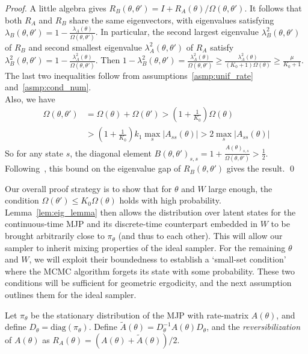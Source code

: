 \begin{proof}
A little algebra gives $R_B(\theta,\theta') = I + R_A(\theta)/\Omega(\theta,\theta')$. It 
follows that both $R_A$ and $R_B$ share the same eigenvectors, with 
eigenvalues satisfying 
$\lambda_B(\theta, \theta') = 1 - \frac{\lambda_A(\theta)}{\Omega(\theta,
\theta')}$. In particular, the second largest eigenvalue 
$\lambda^2_B(\theta,\theta')$ of $R_B$ and  
second smallest eigenvalue $\lambda^2_A(\theta,\theta')$ of $R_A$ satisfy  
$\lambda^2_B(\theta,\theta') = 1 - \frac{\lambda^2_A(\theta)}{\Omega(\theta, \theta')}$.
Then $1 - \lambda^2_B(\theta,\theta') = \frac{\lambda^2_A(\theta)}{\Omega(\theta, \theta')} 
\ge \frac{\lambda^2_A(\theta)}{(K_0+1)\Omega(\theta)} 
\ge \frac{\mu}{K_0+1} $. The last two inequalities follow from 
assumptions~\ref{asmp:unif_rate} and~\ref{asmp:cond_num}. \\
Also, we have
\begin{align*}
\Omega(\theta, \theta') &= \Omega(\theta) + \Omega(\theta') > (1 + \frac{1}{K_0})\Omega(\theta)\\
& > (1 + \frac{1}{K_0})k_1\max_s |A_{ss}(\theta)| > 2\max_s |A_{ss}(\theta)| %
\end{align*}
So for any state $s$, the diagonal element $B(\theta, \theta')_{s,s} = 1 + \frac{A(\theta)_{s,s}}{\Omega(\theta, \theta')}> \frac{1}{2}$.
Following~\cite{fill1991}, this bound on the eigenvalue gap of $R_B(\theta,\theta')$ gives the result.
\qed
\end{proof}

Our overall proof strategy is to show that for $\theta$ and $W$ large enough, 
the condition $\Omega(\theta') \le K_0 \Omega(\theta)$ holds with 
high probability. Lemma~\ref{lem:eig_lemma} then allows the distribution 
over latent states for the continuous-time MJP and its discrete-time 
counterpart embedded in $W$ to be brought arbitrarily close to $\pi_\theta$ 
(and thus to each other).
This will allow our sampler 
to inherit mixing properties of the ideal sampler. For the remaining 
$\theta$ and $W$, we will exploit their boundedness to establish a 
`small-set condition' where the MCMC algorithm forgets its state with 
some probability. These two conditions will be sufficient for 
geometric ergodicity, and the next assumption outlines them for the ideal 
sampler.
\begin{definition}
Let $\pi_\theta$ be the stationary distribution of the MJP with rate-matrix 
$A(\theta)$, and define $D_\theta = \text{diag}(\pi_\theta)$. Define 
$\tilde{A}(\theta) = D_\theta^{-1}A(\theta)D_\theta$, and the 
{\em reversibilization} of $A(\theta)$ as $R_A(\theta) = 
(A(\theta)+\tilde{A}(\theta))/2$. 
\label{def:mjp_symm}
\end{definition}


